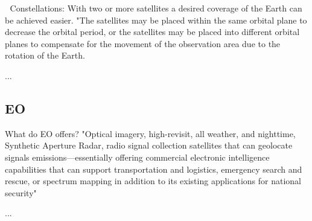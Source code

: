   Constellations: With two or more satellites a desired coverage of the Earth can be achieved easier. "The satellites may be placed within the same orbital plane to decrease the orbital period, or the satellites may be placed into different orbital planes to compensate for the movement of the observation area due to the rotation of the Earth.

%

...

\bigskip
\subsection{EO}
\bigskip

What do EO offers? "Optical imagery, high-revisit, all weather, and nighttime, Synthetic Aperture Radar, radio signal collection satellites that can geolocate signals emissions—essentially offering commercial electronic intelligence capabilities that can support transportation and logistics, emergency search and rescue, or spectrum mapping in addition to its existing applications for national security"
\cite{Hallex}

...